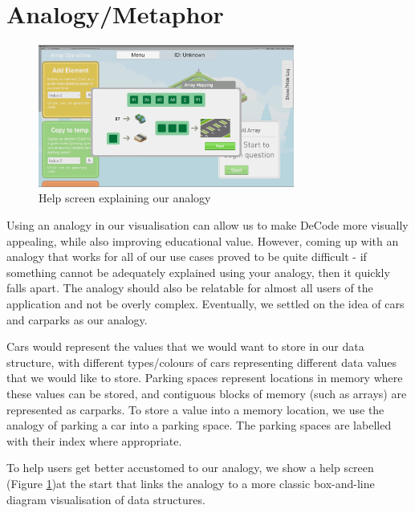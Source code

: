 \documentclass[10pt]{article}
\begin{document}
\section{Analogy/Metaphor}
\begin{figure}
  \centering
  \includegraphics[width=0.75\textwidth]{images/helpanalogy.png}
\caption{Help screen explaining our analogy}
\label{fig:helpanalogy}
\end{figure}
Using an analogy in our visualisation can allow us to make DeCode more visually appealing, while also improving educational value\cite{Park}\cite{vegh2}. However, coming up with an analogy that works for all of our use cases proved to be quite difficult - if something cannot be adequately explained using your analogy, then it quickly falls apart. The analogy should also be relatable for almost all users of the application and not be overly complex. Eventually, we settled on the idea of cars and carparks as our analogy.\par
Cars would represent the values that we would want to store in our data structure, with different types/colours of cars representing different data values that we would like to store. Parking spaces represent locations in memory where these values can be stored, and contiguous blocks of memory (such as arrays) are represented as carparks. To store a value into a memory location, we use the analogy of parking a car into a parking space. The parking spaces are labelled with their index where appropriate.\par
To help users get better accustomed to our analogy, we show a help screen (Figure \ref{fig:helpanalogy})at the start that links the analogy to a more classic box-and-line diagram visualisation of data structures.
\end{document}
